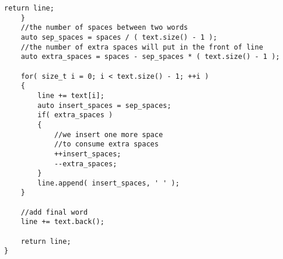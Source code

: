 \begin{lstlisting}[style=customc, caption={Greedy}]
        return line;
    }
    //the number of spaces between two words
    auto sep_spaces = spaces / ( text.size() - 1 );
    //the number of extra spaces will put in the front of line
    auto extra_spaces = spaces - sep_spaces * ( text.size() - 1 );

    for( size_t i = 0; i < text.size() - 1; ++i )
    {
        line += text[i];
        auto insert_spaces = sep_spaces;
        if( extra_spaces )
        {
            //we insert one more space
            //to consume extra spaces
            ++insert_spaces;
            --extra_spaces;
        }
        line.append( insert_spaces, ' ' );
    }

    //add final word
    line += text.back();

    return line;
}
\end{lstlisting}
